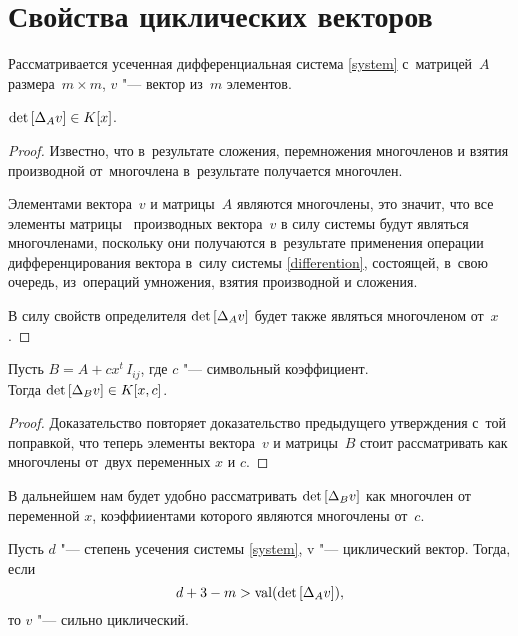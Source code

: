 \section{Свойства циклических векторов}

Рассматривается усеченная дифференциальная система \eqref{system} с~матрицей~$A$ размера~$m \times m$,
$v$ "--- вектор из~$m$ элементов.


\begin{proposition}
    $\mathop{\rm det}\text{$ [\Delta_A v] $} \in K[x]$.
\end{proposition}

\begin{proof}
    Известно, что в~результате сложения, перемножения многочленов и взятия производной от~многочлена
    в~результате получается многочлен.
    
    Элементами вектора~$v$ и матрицы~$A$ являются многочлены,
    это значит, что все элементы матрицы \diffMatrix\ производных вектора~$v$ в силу системы
    будут являться многочленами, поскольку они получаются в~результате применения
    операции дифференцирования вектора в~силу системы \eqref{differention},
    состоящей, в~свою очередь, из~операций умножения, взятия производной и сложения.
    
    В силу свойств определителя $\mathop{\rm det}\text{$ [\Delta_A v] $}$ будет также являться многочленом от~$x$.
\end{proof}


\begin{proposition}
    Пусть $B = A + cx^t \, I_{ij}$, где $c$ "--- символьный коэффициент.\\
    Тогда $\mathop{\rm det}\text{$ [\Delta_B v] $} \in K[x, c]$.
\end{proposition}

\begin{proof}
    Доказательство повторяет доказательство предыдущего утверждения с~той поправкой,
    что теперь элементы вектора~$v$ и матрицы~$B$ стоит рассматривать как многочлены от~двух переменных $x$ и $c$.
\end{proof}

В дальнейшем нам будет удобно рассматривать $\mathop{\rm det}\text{$ [\Delta_B v] $}$
как многочлен от переменной $x$, коэффииентами которого являются многочлены от~$c$.


\begin{proposition}
Пусть $d$ "--- степень усечения системы \eqref{system}, v "--- циклический вектор. Тогда, если
\begin{equation}
	d + 3 - m > \mathop{\rm val}(\mathop{\rm det}\text{$ [\Delta_A v] $}),
	\label{d3m}
\end{equation}
то $v$ "--- сильно циклический.

\end{proposition}

